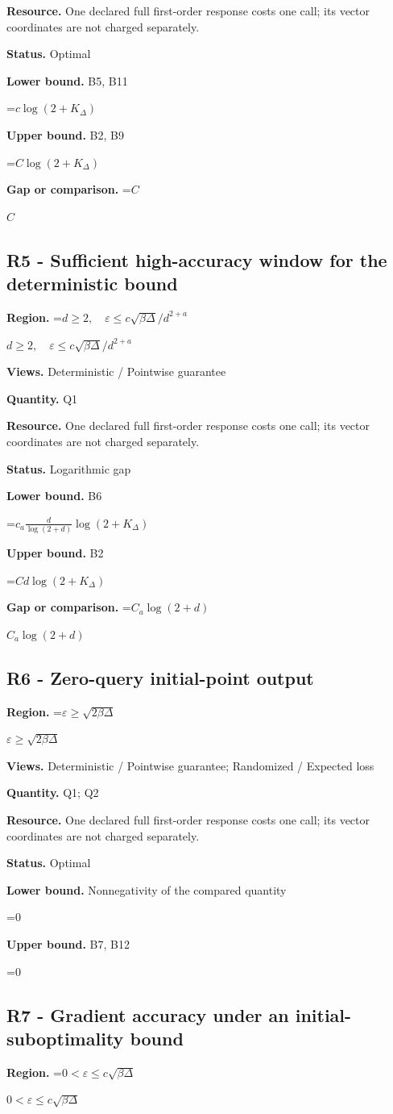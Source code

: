 \documentclass[10pt,a4paper]{article}
\newcommand{\AtlasMath}[1]{\par\begingroup\centering\setbox0=\hbox{$\displaystyle #1$}\ifdim\wd0>1.4\linewidth\typeout{ATLAS WIDE FORMULA: \the\wd0}\fi\ifdim\wd0>\linewidth\resizebox{\linewidth}{!}{\box0}\else\box0\fi\par\endgroup}
\newcommand{\AtlasInlineMath}[1]{\begingroup\setbox0=\hbox{$#1$}\ifdim\wd0>.4\linewidth\endgroup\AtlasMath{#1}\else\endgroup$#1$\fi}
\begin{document}
\textbf{Resource.} One declared full first-order response costs one call; its vector coordinates are not charged separately.

\textbf{Status.} Optimal

\textbf{Lower bound.} B5, B11

\AtlasMath{c\log(2+K_\Delta)}
\textbf{Upper bound.} B2, B9

\AtlasMath{C\log(2+K_\Delta)}
\textbf{Gap or comparison.} \AtlasInlineMath{C}

\subsection{R5 - Sufficient high-accuracy window for the deterministic bound}
\textbf{Region.} \AtlasInlineMath{d\ge2,\quad\varepsilon\le c\sqrt{\beta\Delta}/d^{2+a}}

\textbf{Views.} Deterministic / Pointwise guarantee

\textbf{Quantity.} Q1

\textbf{Resource.} One declared full first-order response costs one call; its vector coordinates are not charged separately.

\textbf{Status.} Logarithmic gap

\textbf{Lower bound.} B6

\AtlasMath{c_a\frac d{\log(2+d)}\log(2+K_\Delta)}
\textbf{Upper bound.} B2

\AtlasMath{C d\log(2+K_\Delta)}
\textbf{Gap or comparison.} \AtlasInlineMath{C_a\log(2+d)}

\subsection{R6 - Zero-query initial-point output}
\textbf{Region.} \AtlasInlineMath{\varepsilon\ge\sqrt{2\beta\Delta}}

\textbf{Views.} Deterministic / Pointwise guarantee; Randomized / Expected loss

\textbf{Quantity.} Q1; Q2

\textbf{Resource.} One declared full first-order response costs one call; its vector coordinates are not charged separately.

\textbf{Status.} Optimal

\textbf{Lower bound.} Nonnegativity of the compared quantity

\AtlasMath{0}
\textbf{Upper bound.} B7, B12

\AtlasMath{0}
\subsection{R7 - Gradient accuracy under an initial-suboptimality bound}
\textbf{Region.} \AtlasInlineMath{0<\varepsilon\le c\sqrt{\beta\Delta}}
\end{document}
